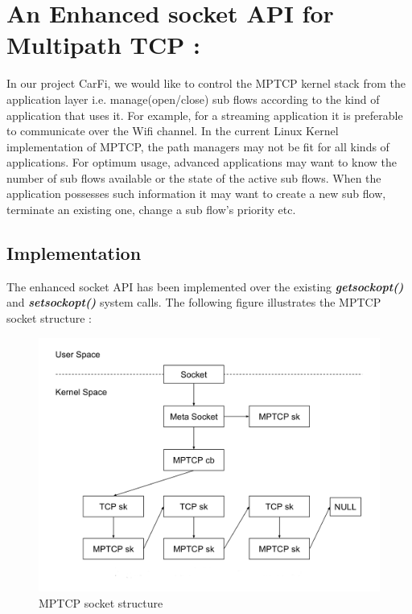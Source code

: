\documentclass[a4paper,11pt]{article}
\begin{document}
	\clearpage
	\section{An Enhanced socket API for Multipath TCP : }

		\label{sec:mptcpapi}
		 In our project CarFi, we would like to control the MPTCP kernel stack from the application layer i.e. manage(open/close) sub flows according to the kind of application that uses it. For example, for a streaming application it is preferable to communicate over the Wifi channel. In the current Linux Kernel implementation of MPTCP, the path managers may not be fit for all kinds of applications. For optimum usage, advanced applications may want to know the number of sub flows available or the state of the active sub flows. When the application possesses such information it may want to create a new sub flow, terminate an existing one, change a sub flow's priority etc.

		\subsection{Implementation}
			The enhanced socket API has been implemented over the existing \textbf{\emph{getsockopt()}} and \textbf{\emph{setsockopt()}} system calls. The following figure illustrates the MPTCP socket structure \cite{api}:
			\begin{figure}[h]
			\begin{center}
				\includegraphics[scale=1.5]{pictures/mptcp_socket_structure.jpg}
				\caption[]{MPTCP socket structure}
			\end{center}
			\end{figure}
\end{document}
